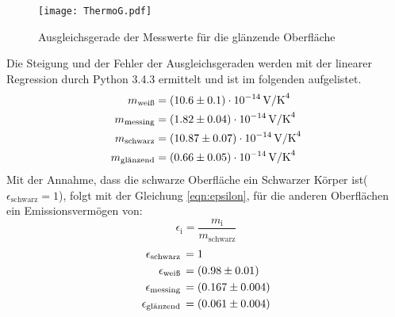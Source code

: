 \begin{figure}[H]
  \centering
  \texttt{[image: ThermoG.pdf]}
  \caption{Ausgleichsgerade der Messwerte für die glänzende Oberfläche}
  \label{fig:ThermoG}
\end{figure}
Die Steigung und der Fehler der Ausgleichsgeraden werden mit der linearer Regression durch Python 3.4.3 ermittelt und ist im folgenden aufgelistet.
\begin{align*}
  m_\text{weiß}     &= (\num{10.6 +- 0.1})   \cdot 10^{-14} \, \text{V/K}^4 \\
  m_\text{messing}  &= (\num{1.82 +- 0.04})  \cdot 10^{-14} \, \text{V/K}^4 \\
  m_\text{schwarz}  &= (\num{10.87 +- 0.07}) \cdot 10^{-14} \, \text{V/K}^4 \\
  m_\text{glänzend} &= (\num{0.66 +- 0.05})  \cdot 10^{-14} \, \text{V/K}^4 \\
\end{align*}
Mit der Annahme, dass die schwarze Oberfläche ein Schwarzer Körper ist($\epsilon_\text{schwarz} = 1$), folgt mit der Gleichung \ref{eqn:epsilon}, für die anderen Oberflächen ein Emissionsvermögen von:
\begin{equation}
  \epsilon_\text{i} = \frac{m_\text{i}}{m_\text{schwarz}}
  \label{eqn:epsilon}
\end{equation}
\begin{align*}
  \epsilon_\text{schwarz}  \, &= 1     \\
  \epsilon_\text{weiß}     \, &= (\num{0.98 +- 0.01}) \\
  \epsilon_\text{messing}  \, &= (\num{0.167 +- 0.004}) \\
  \epsilon_\text{glänzend} \, &= (\num{0.061 +- 0.004}) \\
\end{align*}

\newpage

